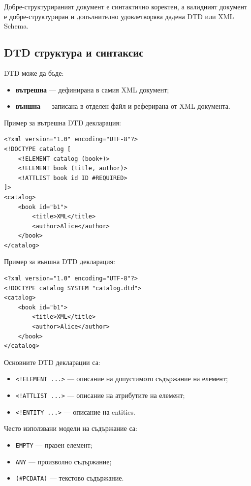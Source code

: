 \documentclass{scrartcl}
\begin{document}
\begin{FlushLeft}
Добре-структурираният документ е синтактично коректен, а валидният документ е добре-структуриран и допълнително удовлетворява дадена DTD или XML Schema.

\subsection{DTD структура и синтаксис}

DTD може да бъде:

\begin{itemize}
    \item \textbf{вътрешна} --- дефинирана в самия XML документ;
    \item \textbf{външна} --- записана в отделен файл и реферирана от XML документа.
\end{itemize}

Пример за вътрешна DTD декларация:

\begin{lstlisting}[caption=Internal DTD declaration example]
<?xml version="1.0" encoding="UTF-8"?>
<!DOCTYPE catalog [
    <!ELEMENT catalog (book+)>
    <!ELEMENT book (title, author)>
    <!ATTLIST book id ID #REQUIRED>
]>
<catalog>
    <book id="b1">
        <title>XML</title>
        <author>Alice</author>
    </book>
</catalog>
\end{lstlisting}

Пример за външна DTD декларация:

\begin{lstlisting}[caption=External DTD declaration example]
<?xml version="1.0" encoding="UTF-8"?>
<!DOCTYPE catalog SYSTEM "catalog.dtd">
<catalog>
    <book id="b1">
        <title>XML</title>
        <author>Alice</author>
    </book>
</catalog>
\end{lstlisting}

Основните DTD декларации са:

\begin{itemize}
    \item \texttt{<!ELEMENT ...>} --- описание на допустимото съдържание на елемент;
    \item \texttt{<!ATTLIST ...>} --- описание на атрибутите на елемент;
    \item \texttt{<!ENTITY ...>} --- описание на entities.
\end{itemize}

Често използвани модели на съдържание са:

\begin{itemize}
    \item \texttt{EMPTY} --- празен елемент;
    \item \texttt{ANY} --- произволно съдържание;
    \item \texttt{(\#PCDATA)} --- текстово съдържание.
\end{itemize}


\end{FlushLeft}
\end{document}
